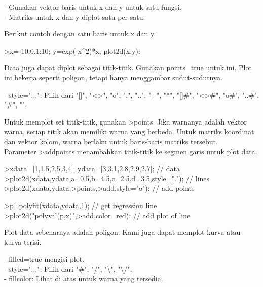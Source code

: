 \documentclass[a4paper,10pt]{article}
\begin{document}
\begin{eulernotebook}
\begin{eulercomment}
\begin{eulercomment}
\begin{eulercomment}
\begin{eulercomment}
\begin{eulercomment}
\begin{eulercomment}
\begin{eulercomment}
- Gunakan vektor baris untuk x dan y untuk satu fungsi.\\
- Matriks untuk x dan y diplot satu per satu.

Berikut contoh dengan satu baris untuk x dan y.
\end{eulercomment}
\begin{eulerprompt}
>x=-10:0.1:10; y=exp(-x^2)*x; plot2d(x,y):
\end{eulerprompt}
\begin{eulercomment}
Data juga dapat diplot sebagai titik-titik. Gunakan points=true untuk
ini. Plot ini bekerja seperti poligon, tetapi hanya menggambar
sudut-sudutnya.

- style="...": Pilih dari "[]", "\textless{}\textgreater{}", "o", ".", "..", "+", "*", "[]#",
"\textless{}\textgreater{}#", "o#", "..#", "#", "\textbar{}".

Untuk memplot set titik-titik, gunakan \textgreater{}points. Jika warnanya adalah
vektor warna, setiap titik akan memiliki warna yang berbeda. Untuk
matriks koordinat dan vektor kolom, warna berlaku untuk baris-baris
matriks tersebut.\\
Parameter \textgreater{}addpoints menambahkan titik-titik ke segmen garis untuk
plot data.
\end{eulercomment}
\begin{eulerprompt}
>xdata=[1,1.5,2.5,3,4]; ydata=[3,3.1,2.8,2.9,2.7]; // data
>plot2d(xdata,ydata,a=0.5,b=4.5,c=2.5,d=3.5,style="."); // lines
>plot2d(xdata,ydata,>points,>add,style="o"): // add points
\end{eulerprompt}
\begin{eulerprompt}
>p=polyfit(xdata,ydata,1); // get regression line
>plot2d("polyval(p,x)",>add,color=red): // add plot of line
\end{eulerprompt}
\begin{eulercomment}
Plot data sebenarnya adalah poligon. Kami juga dapat memplot kurva
atau kurva terisi.

- filled=true mengisi plot.\\
- style="...": Pilih dari "#", "/", "\textbackslash{}", "\textbackslash{}/".\\
- fillcolor: Lihat di atas untuk warna yang tersedia.


\end{eulercomment}
\end{eulercomment}
\end{eulercomment}
\end{eulercomment}
\end{eulercomment}
\end{eulercomment}
\end{eulercomment}
\end{eulernotebook}
\end{document}

